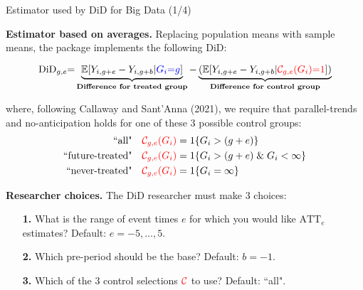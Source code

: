 \documentclass[usenames,dvipsnames]{beamer}
\begin{document}
\begin{frame}{Estimator used by DiD for Big Data (1/4)}



\textbf{Estimator based on averages.} Replacing population means with sample means, the package  implements the following DiD:

\vspace{-0.55cm}

\begin{equation} \notag  
\textrm{DiD}_{g,e} 
{=}
\underbrace{ \mathbb{E}[Y_{i,g+e} - Y_{i,g+b}  | {\color{blue} G_i {=} g} ] }_{\textbf{Difference for treated group}}
{-} \underbrace{
\left(
  \mathbb{E}[Y_{i,g+e} - Y_{i,g+b} | {\color{red} \mathcal{C}_{g,e}(G_i) {=} 1}]      
\right) 
  }_{\textbf{Difference for control group}}  
\end{equation}
 
\vspace{-0.2cm}

where, following Callaway and Sant'Anna (2021), we require that parallel-trends and no-anticipation holds for one of these 3 possible control groups:
\begin{equation} \notag
\begin{aligned}
\text{``all"} & \quad {\color{red} \mathcal{C}_{g,e}(G_i)} = 
1\{ G_i > (g+e) \} \\
\text{``future-treated"} & \quad {\color{red} \mathcal{C}_{g,e}(G_i)} = 
1\{ G_i > (g+e) \; \& \; G_i < \infty \} \\
\text{``never-treated"} & \quad {\color{red} \mathcal{C}_{g,e}(G_i)} = 
1\{  G_i = \infty \}
\end{aligned}
\end{equation}

\vspace{-0.05cm} 

\textbf{Researcher choices.} The DiD researcher must make 3 choices:
\vspace{-0.1cm}
\begin{itemize}
\item[\textbf{1.}] What is the range of event times $e$  for which you would like $\text{ATT}_e$ estimates? Default: $e=-5,...,5$.
\item[\textbf{2.}] Which pre-period should be the base? Default: $b=-1$.
\item[\textbf{3.}] Which of the 3 control selections ${\color{red} \mathcal{C}}$ to use? Default: ``all".
\end{itemize}


\end{frame}
\end{document}
